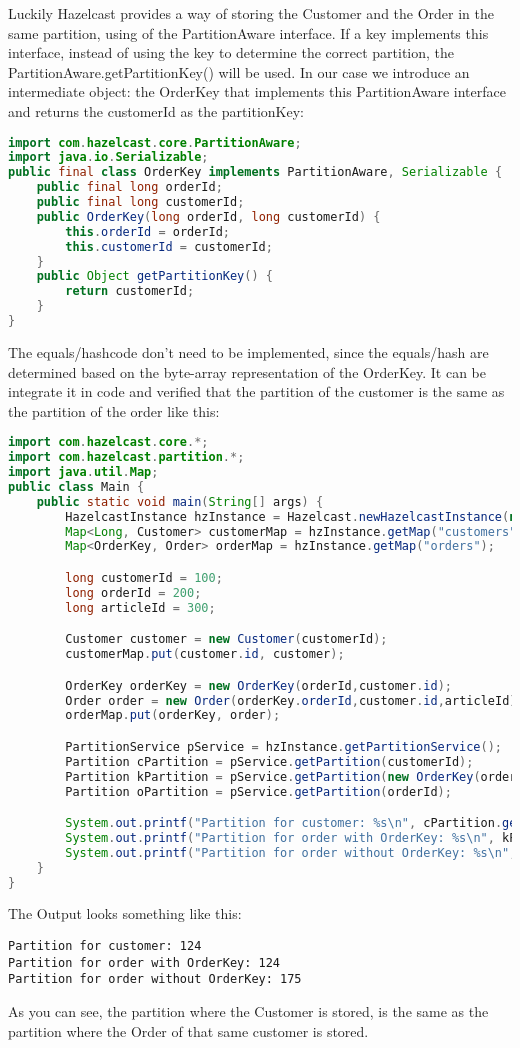 Luckily Hazelcast provides a way of storing the Customer and the Order in the same partition, using of the PartitionAware interface. If a key implements this interface, instead of using the key to determine the correct partition, the PartitionAware.getPartitionKey() will be used. In our case we introduce an intermediate object: the OrderKey that implements this PartitionAware interface and returns the customerId as the partitionKey:
\begin{lstlisting}[language=java]
import com.hazelcast.core.PartitionAware;
import java.io.Serializable;
public final class OrderKey implements PartitionAware, Serializable {
    public final long orderId;
    public final long customerId;
    public OrderKey(long orderId, long customerId) {
        this.orderId = orderId;
        this.customerId = customerId;
    }
    public Object getPartitionKey() {
        return customerId;
    }
}
\end{lstlisting}
The equals/hashcode don't need to be implemented, since the equals/hash are determined based on the byte-array representation of the OrderKey. It can be integrate it in code and verified that the partition of the customer is the same as the partition of the order like this:
\begin{lstlisting}[language=java]
import com.hazelcast.core.*;
import com.hazelcast.partition.*;
import java.util.Map;
public class Main {
    public static void main(String[] args) {
        HazelcastInstance hzInstance = Hazelcast.newHazelcastInstance(null);
        Map<Long, Customer> customerMap = hzInstance.getMap("customers");
        Map<OrderKey, Order> orderMap = hzInstance.getMap("orders");

        long customerId = 100;
        long orderId = 200;
        long articleId = 300;

        Customer customer = new Customer(customerId);
        customerMap.put(customer.id, customer);

        OrderKey orderKey = new OrderKey(orderId,customer.id);
        Order order = new Order(orderKey.orderId,customer.id,articleId);
        orderMap.put(orderKey, order);

        PartitionService pService = hzInstance.getPartitionService();
        Partition cPartition = pService.getPartition(customerId);
        Partition kPartition = pService.getPartition(new OrderKey(orderId, customerId));
        Partition oPartition = pService.getPartition(orderId);

        System.out.printf("Partition for customer: %s\n", cPartition.getPartitionId());
        System.out.printf("Partition for order with OrderKey: %s\n", kPartition.getPartitionId());
        System.out.printf("Partition for order without OrderKey: %s\n", oPartition.getPartitionId());
    }
}
\end{lstlisting}
The Output looks something like this:
\begin{lstlisting}
Partition for customer: 124
Partition for order with OrderKey: 124
Partition for order without OrderKey: 175
\end{lstlisting}
As you can see, the partition where the Customer is stored, is the same as the partition where the Order of that same customer is stored. 

